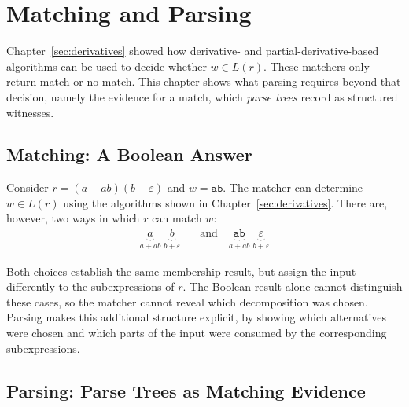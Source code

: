 \chapter{Matching and Parsing}
\label{sec:matching-vs-parsing}

Chapter~\ref{sec:derivatives} showed how 
derivative- and partial-derivative-based algorithms 
can be used to decide whether $w \in L(r)$.
These matchers only return match or no match. 
This chapter shows what parsing requires beyond that decision, 
namely the evidence for a match, 
which \emph{parse trees} record as structured witnesses.

%
%
%

\section{Matching: A Boolean Answer}
\label{sec:matching-problem}

Consider $r = (a+ab)(b+\varepsilon)$ and $w = \mathtt{ab}$. 
The matcher can determine $w \in L(r)$ 
using the algorithms shown in Chapter~\ref{sec:derivatives}. 
There are, however, two ways in which $r$ can match $w$:
\begin{equation}
\begin{aligned}
\underbrace{a}_{a+ab}\; \underbrace{b}_{b+\varepsilon}
\quad&\text{and}\quad
\underbrace{\mathtt{ab}}_{a+ab}\; \underbrace{\varepsilon}_{b+\varepsilon}
\end{aligned}
\label{eq:match-decompositions}
\end{equation}

Both choices establish the same membership result,
but assign the input differently to the subexpressions of $r$.
The Boolean result alone cannot distinguish these cases,
so the matcher cannot reveal which decomposition was chosen.
Parsing makes this additional structure explicit, 
by showing which alternatives were chosen 
and which parts of the input were consumed 
by the corresponding subexpressions.

%
%
%


\section{Parsing: Parse Trees as Matching Evidence}
\label{sec:parse-trees-as-evidence}

